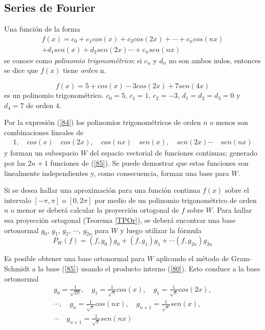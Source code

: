  
 \subsection{Series de Fourier}
 
 Una función de la forma
 \begin{eqnarray}
  f(x)=c_0 + c_1 cos(x) + c_2 cos(2x) +  \cdots  + c_n cos(nx)  \nonumber\\
       + d_1 sen(x) + d_2 sen(2x) \cdots  + c_n sen(nx) 
       \label{84}
  \end{eqnarray} 
  se conoce como \textit{polinomio trigonométrico}; si $c_n$ y $d_n$   no son ambos nulos, entonces se dice que $f(x)$ tiene \textit{orden} n.

  \bigskip
  
\begin{example}
  \[
  f(x)=5 + cos(x) - 3 cos(2x) + 7 sen(4x)
       \]
       es un polinomio trigonométrico.  $c_0=5$, $c_1=1$, $c_2=-3$, $d_1=d_2=d_3=0$ y $d_4=7$
de orden $4$.
\end{example}

\bigskip

Por la expresión (\ref{84}) los polinomios trigonométricos de orden $n$ o menos son combinaciones lineales de 
\begin{eqnarray}
  1, \quad cos(x) \quad cos(2x), \quad cos(nx)  \quad  sen(x), \quad sen(2x) \cdots  \quad sen(nx) 
       \label{85}
  \end{eqnarray} 
  y forman un subespacio $W$ del espacio vectorial de funciones continuas; generado por las $2n+1$ funciones de (\ref{85}). Se puede demostrar que estas funciones son linealmente independientes y, como consecuencia, forman una base para $W$.
  
Si se desea hallar una aproximación para una función continua $f(x)$ sobre el intervalo $[-\pi, \pi]$ o $[0, 2\pi]$ por medio de un polinomio trigonométrico de orden $n$ o menor se deberá calcular la proyección ortogonal de $f$ sobre $W$. Para hallar esa proyección ortogonal (Teorema \ref{TPOr}), se deberá encontrar una base ortonormal $g_0$, $g_1$, $g_2$, $\cdots$, $g_{2n}$ para $W$ y luego utilizar la fórmula
\begin{equation}
P_W( f)= (f,g_0)g_0 + (f, g_1)g_1 +  \cdots (f, g_{2n})g_{2n}
 \label{86}
  \end{equation}
  
 Es posible obtener una base ortonormal para $W$ aplicando el método de Gram-Schmidt  a la base (\ref{85}) usando el producto interno (\ref{80}).
 Esto conduce a la base ortonormal
 \begin{eqnarray}
  g_0= \frac{1}{\sqrt{2\pi}}, \quad g_1= \frac{1}{\sqrt{\pi}}   cos(x),  \quad  g_1= \frac{1}{\sqrt{\pi}} cos(2x),\nonumber\\
  \cdots, \quad g_n= \frac{1}{\sqrt{\pi}}  cos(nx),   \quad g_{n+1}= \frac{1}{\sqrt{\pi}} sen(x), \nonumber\\
  \cdots  \quad g_{n+1}= \frac{1}{\sqrt{\pi}}   sen(nx) \nonumber\\
       \label{87}
  \end{eqnarray} 
  
